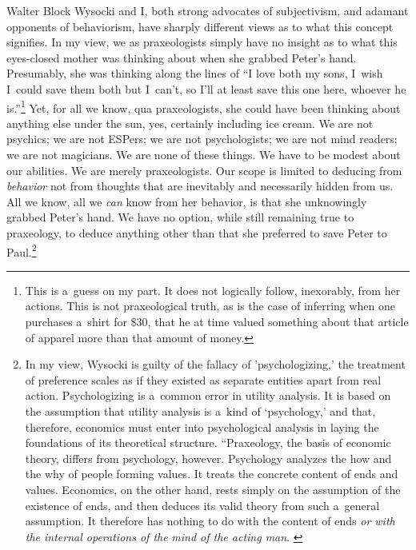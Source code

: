 \begin{artengenv}{Walter Block}
Wysocki and I, both strong advocates of subjectivism, and adamant opponents of behaviorism, have sharply different views as to what this concept signifies. In my view, we as praxeologists simply have no insight as to what this eyes-closed mother was thinking about when she grabbed Peter's hand. Presumably, she was thinking along the lines of ``I love both my sons, I~wish I~could save them both but I~can't, so I'll at least save this one here, whoever he is.''\footnote{This is a~guess on my part. It does not logically follow, inexorably, from her actions. This is not praxeological truth, as is the case of inferring when one purchases a~shirt for \$30, that he at time valued something about that article of apparel more than that amount of money.} Yet, for all we know, qua praxeologists, she could have been thinking about anything else under the sun, yes, certainly including ice cream. We are not psychics; we are not ESPers; we are not psychologists; we are not mind readers; we are not magicians. We are none of these things. We have to be modest about our abilities. We are merely praxeologists. Our scope is limited to deducing from \textit{behavior} not from thoughts that are inevitably and necessarily hidden from us. All we know, all we \textit{can} know from her behavior, is that she unknowingly grabbed Peter's hand. We have no option, while still remaining true to praxeology, to deduce anything other than that she preferred to save Peter to Paul.\footnote{In my view, Wysocki is guilty of the fallacy of 'psychologizing,' the treatment of preference scales as if they existed as separate entities apart from real action. Psychologizing is a~common error in utility analysis. It is based on the assumption that utility analysis is a~kind of ‘psychology,' and that, therefore, economics must enter into psychological analysis in laying the foundations of its theoretical structure. ``Praxeology, the basis of economic theory, differs from psychology, however. Psychology analyzes the how and the why of people forming values. It treats the concrete content of ends and values. Economics, on the other hand, rests simply on the assumption of the existence of ends, and then deduces its valid theory from such a~general assumption. It therefore has nothing to do with the content of ends \textit{or with the internal operations of the} \textit{mind of the acting man}. 
\parencites[][]{rothbard_toward_2011}[emphasis added by present author,][]{}%
}




\end{artengenv}
